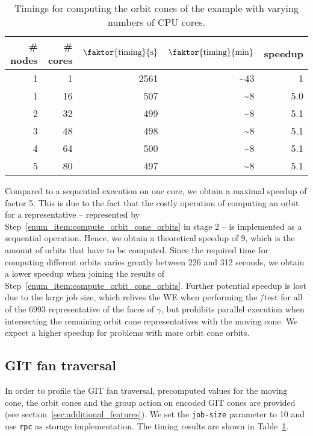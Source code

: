 \begin{table}
	\centering
	\begin{tabular}{@{}rrrrr@{}}
		\toprule
		\# nodes & \# cores & $\faktor{\text{timing}}{\text{s}}$ & $\faktor{\text{timing}}{\text{min}}$ & speedup \\
		\midrule
		1 & 1  & 2561 & \textasciitilde 43 & 1   \\
		1 & 16 & 507  & \textasciitilde 8  & 5.0 \\
		2 & 32 & 499  & \textasciitilde 8  & 5.1 \\
		3 & 48 & 498  & \textasciitilde 8  & 5.1 \\
		4 & 64 & 500  & \textasciitilde 8  & 5.1 \\
		5 & 80 & 497  & \textasciitilde 8  & 5.1 \\
		\bottomrule
	\end{tabular}
	\caption{Timings for computing the orbit cones of the \msix{} example with varying numbers of CPU cores.}
	\label{table:performance_orbit_cones}
\end{table}

Compared to a sequential execution on one core, we obtain a maximal speedup of factor 5. This is due to the fact that the costly operation of computing an orbit for a representative -- represented by Step~\ref{enum_item:compute_orbit_cone_orbits} in stage 2 -- is implemented as a sequential operation. Hence, we obtain a theoretical speedup of 9, which is the amount of orbits that have to be computed. Since the required time for computing different orbits varies greatly between 226 and 312 seconds, we obtain a lower speedup when joining the results of Step~\ref{enum_item:compute_orbit_cone_orbits}. Further potential speedup is lost due to the large job size, which relives the \ac{WE} when performing the \aface{}\=/test for all of the 6993 representative of the faces of $\gamma$, but prohibits parallel execution when intersecting the remaining orbit cone representatives with the moving cone. We expect a higher speedup for problems with more orbit cone orbits.

\subsection*{GIT fan traversal}

In order to profile the GIT fan traversal, precomputed values for the moving cone, the orbit cones and the group action on encoded GIT cones are provided (see section~\ref{sec:additional_features}). We set the \texttt{job-size} parameter to 10 and use \texttt{rpc} as storage implementation. The timing results are shown in Table~\ref{table:performance_orbit_cones}.

